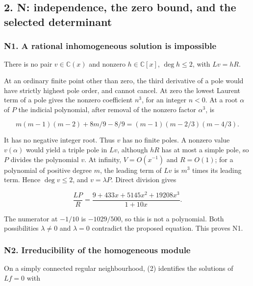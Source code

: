 \documentclass[11pt,a4paper]{article}
\begin{document}
\hypertarget{n-independence-the-zero-bound-and-the-selected-determinant}{%
\subsection{2. N: independence, the zero bound, and the selected determinant}\label{n-independence-the-zero-bound-and-the-selected-determinant}}

\hypertarget{n1.-a-rational-inhomogeneous-solution-is-impossible}{%
\subsubsection{N1. A rational inhomogeneous solution is impossible}\label{n1.-a-rational-inhomogeneous-solution-is-impossible}}

There is no pair \(v∈\mathbb{C}(x)\) and nonzero \(h∈\mathbb{C}[x]\), \(\operatorname{deg} h≤2\), with \(Lv=hR\).

At an ordinary finite point other than zero, the third derivative of a pole would have strictly highest pole order, and cannot cancel. At zero the lowest Laurent term of a pole gives the nonzero coefficient \(n^{3}\), for an integer \(n<0\). At a root \(α\) of \(P\) the indicial polynomial, after removal of the nonzero factor \(α^{3}\), is

\[
m(m-1)(m-2)+8m/9-8/9
=(m-1)(m-2/3)(m-4/3).
\]

It has no negative integer root. Thus \(v\) has no finite poles. A nonzero value \(v(α)\) would yield a triple pole in \(Lv\), although \(hR\) has at most a simple pole, so \(P\) divides the polynomial \(v\). At infinity, \(V=O(x^{-1})\) and \(R=O(1)\); for a polynomial of positive degree \(m\), the leading term of \(Lv\) is \(m^{3}\) times its leading term. Hence \(\operatorname{deg} v≤2\), and \(v=λP\). Direct division gives

\[
\frac{LP}{R}=
\frac{9+433x+5145x^2+19208x^3}{1+10x}.
\]

The numerator at \(-1/10\) is \(-1029/500\), so this is not a polynomial. Both possibilities \(λ≠0\) and \(λ=0\) contradict the proposed equation. This proves N1.

\hypertarget{n2.-irreducibility-of-the-homogeneous-module}{%
\subsubsection{N2. Irreducibility of the homogeneous module}\label{n2.-irreducibility-of-the-homogeneous-module}}

On a simply connected regular neighbourhood, (2) identifies the solutions of \(Lf=0\) with
\end{document}
